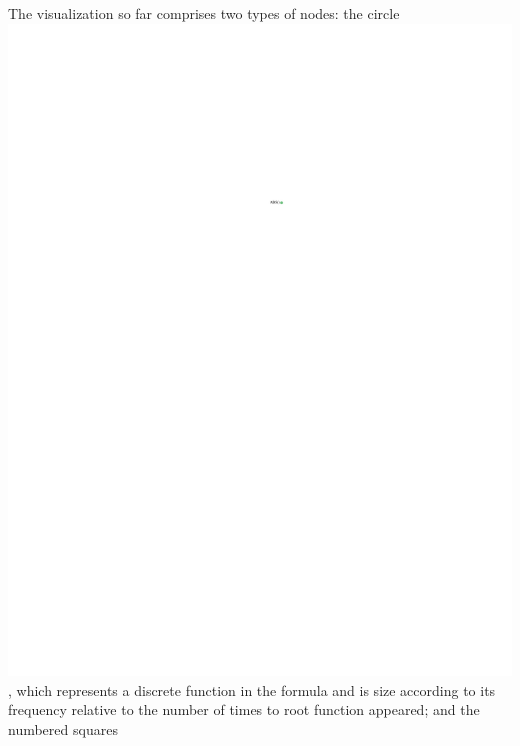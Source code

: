\documentclass[conference]{IEEEtran}
\begin{document}
	The visualization so far comprises two types of nodes: the circle
	\includegraphics{glossary-greenonly}, which represents a discrete function in
	the formula and is size according to its frequency relative to the number of
	times to root function appeared; and the numbered squares
\end{document}
